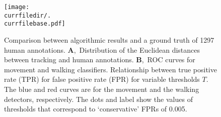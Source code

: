 \begin{figure}[h!]
  \centering   
    \texttt{[image: \\currfiledir/.\\currfilebase.pdf]}
  \caption[Validation of the algorithm]{
  	Comparison between algorithmic results and a ground truth of 1297 human annotations.
  	\textbf{A},~Distribution of the Euclidean distances between tracking and human annotations.
	\textbf{B},~ROC curves for movement and walking classifiers.
	Relationship between true positive rate (TPR) for false positive rate (FPR) for variable thresholds $T$.
	The blue and red curves are for  the movement  and the walking  detectors, respectively. 
	The dots and label show the values of  thresholds  that correspond to `conservative' FPRs of 0.005.	
  \label{fig:\currfilebase}
  }
\end{figure}





